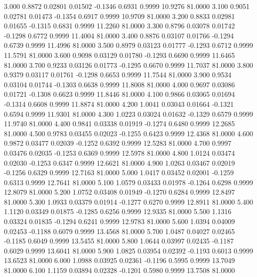    3.000   0.8872   0.02801   0.01502  -0.1346   0.6931   0.9999  10.9276  81.0000
   3.100   0.9051   0.02781   0.01473  -0.1354   0.6917   0.9999  10.9709  81.0000
   3.200   0.8833   0.02981   0.01655  -0.1315   0.6831   0.9999  11.2260  81.0000
   3.300   0.8796   0.03078   0.01742  -0.1298   0.6772   0.9999  11.4004  81.0000
   3.400   0.8876   0.03107   0.01766  -0.1294   0.6739   0.9999  11.4996  81.0000
   3.500   0.8979   0.03123   0.01777  -0.1293   0.6712   0.9999  11.5791  81.0000
   3.600   0.9098   0.03129   0.01780  -0.1293   0.6690   0.9999  11.6465  81.0000
   3.700   0.9233   0.03126   0.01773  -0.1295   0.6670   0.9999  11.7037  81.0000
   3.800   0.9379   0.03117   0.01761  -0.1298   0.6653   0.9999  11.7544  81.0000
   3.900   0.9534   0.03104   0.01744  -0.1303   0.6638   0.9999  11.8008  81.0000
   4.000   0.9697   0.03086   0.01721  -0.1308   0.6623   0.9999  11.8446  81.0000
   4.100   0.9866   0.03065   0.01694  -0.1314   0.6608   0.9999  11.8874  81.0000
   4.200   1.0041   0.03043   0.01664  -0.1321   0.6594   0.9999  11.9301  81.0000
   4.300   1.0223   0.03024   0.01632  -0.1329   0.6579   0.9999  11.9740  81.0000
   4.400   0.9841   0.03338   0.01919  -0.1274   0.6480   0.9999  12.2685  81.0000
   4.500   0.9783   0.03455   0.02023  -0.1255   0.6423   0.9999  12.4368  81.0000
   4.600   0.9872   0.03477   0.02039  -0.1252   0.6392   0.9999  12.5283  81.0000
   4.700   0.9997   0.03476   0.02035  -0.1253   0.6369   0.9999  12.5978  81.0000
   4.800   1.0124   0.03474   0.02030  -0.1253   0.6347   0.9999  12.6621  81.0000
   4.900   1.0263   0.03467   0.02019  -0.1256   0.6329   0.9999  12.7163  81.0000
   5.000   1.0417   0.03452   0.02001  -0.1259   0.6313   0.9999  12.7641  81.0000
   5.100   1.0579   0.03433   0.01978  -0.1264   0.6298   0.9999  12.8079  81.0000
   5.200   1.0752   0.03408   0.01949  -0.1270   0.6284   0.9999  12.8497  81.0000
   5.300   1.0933   0.03379   0.01914  -0.1277   0.6270   0.9999  12.8911  81.0000
   5.400   1.1120   0.03349   0.01875  -0.1285   0.6256   0.9999  12.9335  81.0000
   5.500   1.1316   0.03324   0.01835  -0.1294   0.6241   0.9999  12.9783  81.0000
   5.600   1.0394   0.04009   0.02453  -0.1188   0.6079   0.9999  13.4568  81.0000
   5.700   1.0487   0.04027   0.02465  -0.1185   0.6049   0.9999  13.5455  81.0000
   5.800   1.0644   0.03997   0.02435  -0.1187   0.6029   0.9999  13.6041  81.0000
   5.900   1.0825   0.03954   0.02392  -0.1193   0.6013   0.9999  13.6523  81.0000
   6.000   1.0988   0.03925   0.02361  -0.1196   0.5995   0.9999  13.7049  81.0000
   6.100   1.1159   0.03894   0.02328  -0.1201   0.5980   0.9999  13.7508  81.0000
